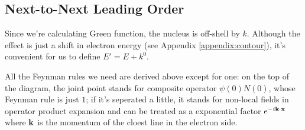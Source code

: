 \documentclass[aps,prd,preprint,showkeys,10pt]{revtex4-1}
\newcommand{\vbk}{\vb{k}}
\begin{document}
\subsection{Next-to-Next Leading Order}
Since we're calculating Green function, the nucleus is off-shell by $k$. Although the effect is just a shift in electron energy (see Appendix \ref{appendix:contour}), it's convenient for us to define $E'=E+k^0$. 

All the Feynman rules we need are derived above except for one: on the top of the diagram, the joint point stands for composite operator $\psi(0)N(0)$, whose Feynman rule is just $1$; if it's seperated a little, it stands for non-local fields in operator product expansion and can be treated as a exponential factor $e^{-i \vbk \cdot \vb{x}}$ where $\vbk$ is the momentum of the cloest line in the electron side. 
\end{document}

